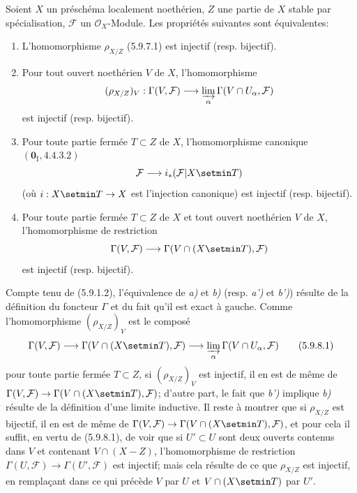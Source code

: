 \begin{proposition}[5.9.8]
Soient $X$ un préschéma localement noethérien, $Z$ une partie de $X$ stable
par spécialisation, $\mathcal F$ un $\mathcal O_X$-Module. Les propriétés
suivantes sont équivalentes:
\begin{enumerate}
\item[\textup{a)}] L'homomorphisme $\rho_{X/Z}$ \textup{(5.9.7.1)} est injectif
(\textup{resp.} bijectif).
\item[\textup{b)}] Pour tout ouvert noethérien $V$ de $X$, l'homomorphisme
\[
(\rho_{X/Z})_V:\Gamma(V,\mathcal F)\longrightarrow
\varinjlim_\alpha\Gamma(V\cap U_\alpha,\mathcal F)
\]
est injectif (\textup{resp.} bijectif).
\item[\textup{a')}] Pour toute partie fermée $T\subset Z$ de $X$, l'homomorphisme
canonique $(\mathbf{0}_{\mathrm I},4.4.3.2)$
\[
\mathcal F\longrightarrow i_*(\mathcal F|X\setmin T)
\]
(où $i:X\setmin T\to X$ est l'injection canonique) est injectif
(\textup{resp.} bijectif).
\item[\textup{b')}] Pour toute partie fermée $T\subset Z$ de $X$ et tout ouvert
noethérien $V$ de $X$, l'homomorphisme de restriction
\[
\Gamma(V,\mathcal F)\longrightarrow
\Gamma(V\cap(X\setmin T),\mathcal F)
\]
est injectif (\textup{resp.} bijectif).
\end{enumerate}
\end{proposition}

Compte tenu de (5.9.1.2), l'équivalence de \emph{a)} et \emph{b)} (resp. \emph{a')} et \emph{b')})
résulte de
la définition du foncteur $\Gamma$ et du fait qu'il est exact à gauche.
Comme l'homomorphisme $(\rho_{X/Z})_V$ est le composé
\begin{equation}
\Gamma(V,\mathcal F)\longrightarrow
\Gamma(V\cap(X\setmin T),\mathcal F)\longrightarrow
\varinjlim_\alpha\Gamma(V\cap U_\alpha,\mathcal F)
\tag{5.9.8.1}\label{IV.2.s5.9.8.1-fr}
\end{equation}
pour toute partie fermée $T\subset Z$, si $(\rho_{X/Z})_V$ est injectif, il
en est de même de
$\Gamma(V,\mathcal F)\to\Gamma(V\cap(X\setmin T),\mathcal F)$; d'autre part, le
fait que \emph{b')} implique \emph{b)} résulte de la définition d'une limite inductive. Il
reste à montrer que si $\rho_{X/Z}$ est bijectif, il en est de même de
$\Gamma(V,\mathcal F)\to\Gamma(V\cap(X\setmin T),\mathcal F)$, et pour cela il
suffit, en vertu de (5.9.8.1), de voir que si $U'\subset U$ sont deux
ouverts contenus dans $V$ et contenant $V\cap(X-Z)$, l'homomorphisme de
restriction $\Gamma(U,\mathcal F)\to\Gamma(U',\mathcal F)$ est injectif;
mais cela résulte de ce que $\rho_{X/Z}$ est injectif, en remplaçant dans ce
qui précède $V$ par $U$ et $V\cap(X\setmin T)$ par $U'$.

